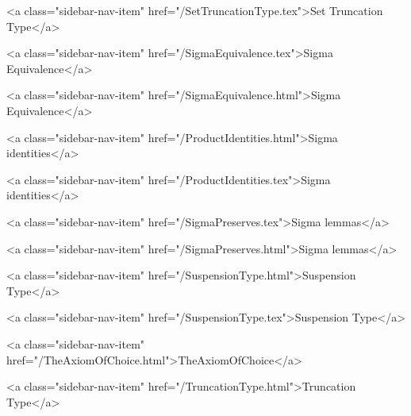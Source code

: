       
    
      
        
          <a class="sidebar-nav-item" href="/SetTruncationType.tex">Set Truncation Type</a>
        
      
    
      
        
          <a class="sidebar-nav-item" href="/SigmaEquivalence.tex">Sigma Equivalence</a>
        
      
    
      
        
          <a class="sidebar-nav-item" href="/SigmaEquivalence.html">Sigma Equivalence</a>
        
      
    
      
        
          <a class="sidebar-nav-item" href="/ProductIdentities.html">Sigma identities</a>
        
      
    
      
        
          <a class="sidebar-nav-item" href="/ProductIdentities.tex">Sigma identities</a>
        
      
    
      
        
          <a class="sidebar-nav-item" href="/SigmaPreserves.tex">Sigma lemmas</a>
        
      
    
      
        
          <a class="sidebar-nav-item" href="/SigmaPreserves.html">Sigma lemmas</a>
        
      
    
      
        
          <a class="sidebar-nav-item" href="/SuspensionType.html">Suspension Type</a>
        
      
    
      
        
          <a class="sidebar-nav-item" href="/SuspensionType.tex">Suspension Type</a>
        
      
    
      
        
          <a class="sidebar-nav-item" href="/TheAxiomOfChoice.html">TheAxiomOfChoice</a>
        
      
    
      
        
          <a class="sidebar-nav-item" href="/TruncationType.html">Truncation Type</a>
        
